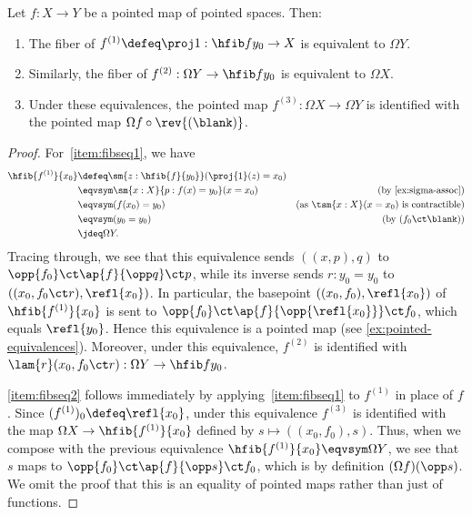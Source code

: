 \begin{lem}\label{thm:fiber-of-the-fiber}
  Let $f:X\to Y$ be a pointed map of pointed spaces.  Then:
  \begin{enumerate}
  \item The fiber of $f^{(1)}\defeq \proj1 : \hfib f {y_0} \to X$ is equivalent to $\Omega Y$.\label{item:fibseq1}
  \item Similarly, the fiber of $f^{(2)} : \Omega Y \to \hfib f {y_0}$ is equivalent to $\Omega X$.\label{item:fibseq2}
  \item Under these equivalences, the pointed map $f^{(3)} : \Omega X\to \Omega Y$ is identified with the pointed map $\Omega f\circ\rev{(\blank)}$.\label{item:fibseq3}
  \end{enumerate}
\end{lem}
\begin{proof}
  For~\ref{item:fibseq1}, we have
  \begin{align*}
    \hfib{f^{(1)}}{x_0}
    &\defeq \sm{z:\hfib{f}{y_0}} (\proj{1}(z) = x_0)\\
    &\eqvsym \sm{x:X}{p:f(x)=y_0} (x = x_0) &\text{(by \cref{ex:sigma-assoc})}\\
    &\eqvsym (f(x_0) = y_0) &\text{(as $\tsm{x:X} (x=x_0)$ is contractible)}\\
    &\eqvsym (y_0 = y_0) &\text{(by $(f_0 \ct \blank)$)}\\
    &\jdeq \Omega Y.
  \end{align*}
  Tracing through, we see that this equivalence sends $((x,p),q)$ to $\opp{f_0} \ct \ap{f}{\opp q} \ct p$, while its inverse sends $r:y_0=y_0$ to $((x_0, f_0 \ct r), \refl{x_0})$.
  In particular, the basepoint $((x_0,f_0),\refl{x_0})$ of $\hfib{f^{(1)}}{x_0}$ is sent to $\opp{f_0} \ct \ap{f}{\opp {\refl{x_0}}} \ct f_0$, which equals $\refl{y_0}$.
  Hence this equivalence is a pointed map (see \cref{ex:pointed-equivalences}).
  Moreover, under this equivalence, $f^{(2)}$ is identified with $\lam{r} (x_0, f_0 \ct r): \Omega Y \to \hfib f {y_0}$.

  \cref{item:fibseq2} follows immediately by applying~\ref{item:fibseq1} to $f^{(1)}$ in place of $f$.
  Since $(f^{(1)})_0 \defeq \refl{x_0}$, under this equivalence $f^{(3)}$ is identified with the map $\Omega X \to \hfib {f^{(1)}}{x_0}$ defined by $s \mapsto ((x_0,f_0),s)$.
  Thus, when we compose with the previous equivalence $\hfib {f^{(1)}}{x_0} \eqvsym \Omega Y$, we see that $s$ maps to $\opp{f_0} \ct \ap{f}{\opp s} \ct f_0$, which is by definition $(\Omega f)(\opp s)$. We omit the proof that this is an equality of pointed maps rather than just of functions.
\end{proof}

